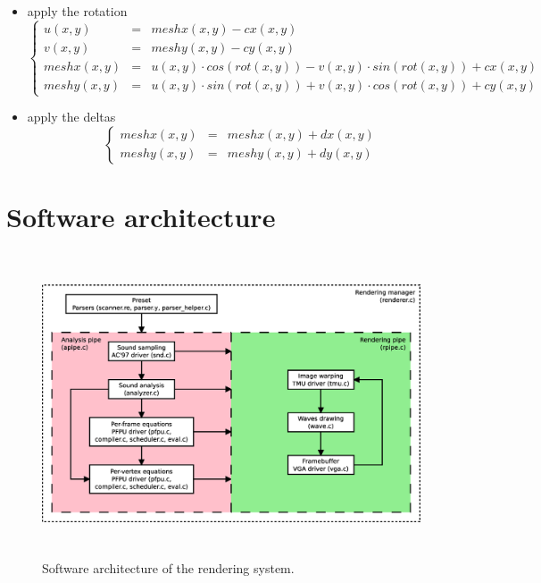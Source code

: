 \documentclass[a4paper,11pt]{article}
\begin{document}
\begin{itemize}
\item apply the rotation
\[
\left\{ \begin{array}{rrlr}
u(x, y) & = & meshx(x, y) - cx(x, y) \\
v(x, y) & = & meshy(x, y) - cy(x, y) \\
meshx(x, y) & = & u(x, y) \cdot cos(rot(x, y)) - v(x, y) \cdot sin(rot(x, y)) + cx(x, y) \\
meshy(x, y) & = & u(x, y) \cdot sin(rot(x, y)) + v(x, y) \cdot cos(rot(x, y)) + cy(x, y)
\end{array}
\right.
\]

\item apply the deltas
\[
\left\{ \begin{array}{rrlr}
meshx(x, y) & = & meshx(x, y) + dx(x, y)\\
meshy(x, y) & = & meshy(x, y) + dy(x, y)
\end{array}
\right.
\]

\end{itemize}

\section{Software architecture}
\begin{figure}[htp]
\centering
\includegraphics[height=90mm]{swarch.eps}
\caption{Software architecture of the rendering system.}\label{fig:flow}
\end{figure}
\end{document}

